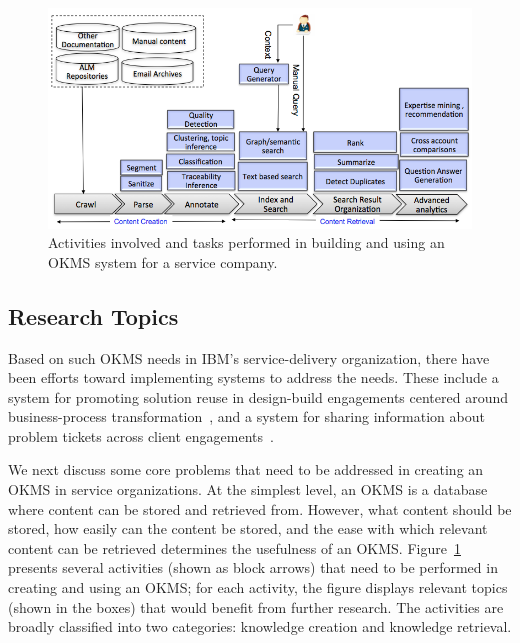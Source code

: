 \begin{figure}[t]
	\center
	\includegraphics[width=\columnwidth]{figs/km.png}
        \vspace*{-18pt}
	\caption{Activities involved and tasks performed in building and using
          an OKMS system for a service company.}
        \vspace*{-10pt}
	\label{fig-km}
\end{figure}

\subsection{Research Topics}

Based on such OKMS needs in IBM's service-delivery organization, there have been
efforts toward implementing systems to address the needs. These include a system
for promoting solution reuse in design-build engagements centered around
business-process transformation~\cite{Goodwin:2012b}, and a system for sharing
information about problem tickets across client
engagements~\cite{Majumdar:2011}.

We next discuss some core problems that need to be addressed in creating an OKMS
in service organizations. At the simplest level, an OKMS is a database where
content can be stored and retrieved from. However, what content should be
stored, how easily can the content be stored, and the ease with which relevant
content can be retrieved determines the usefulness of an OKMS.
Figure~\ref{fig-km} presents several activities (shown as block arrows) that
need to be performed in creating and using an OKMS; for each activity, the
figure displays relevant topics (shown in the boxes) that would benefit from
further research. The activities are broadly classified into two categories:
knowledge creation and knowledge retrieval.




